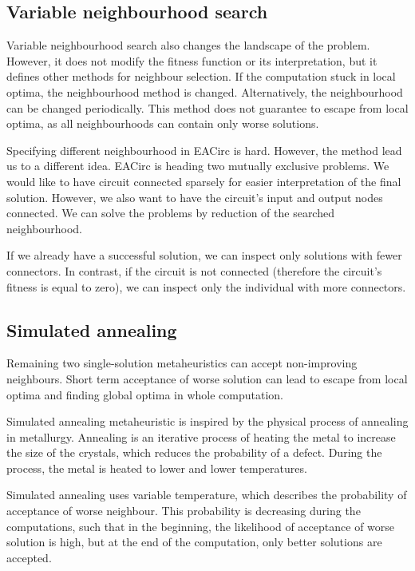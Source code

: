 \documentclass[
  print, %
  Table,   %
  nolof,     %
  nolot,     %
  11pt, %
  oneside  %
]{fithesis3}
\begin{document}
\subsection{Variable neighbourhood search}
\label{subsec:opt-single-sol-vns}

Variable neighbourhood search also changes the landscape of the problem. However, it does not modify the fitness function or its interpretation, but it defines other methods for neighbour selection. If the computation stuck in local optima, the neighbourhood method is changed. Alternatively, the neighbourhood can be changed periodically. This method does not guarantee to escape from local optima, as all neighbourhoods can contain only worse solutions.

Specifying different neighbourhood in EACirc is hard. However, the method lead us to a different idea. EACirc is heading two mutually exclusive problems. We would like to have circuit connected sparsely for easier interpretation of the final solution. However, we also want to have the circuit's input and output nodes connected. We can solve the problems by reduction of the searched neighbourhood.

If we already have a successful solution, we can inspect only solutions with fewer connectors. In contrast, if the circuit is not connected (therefore the circuit's fitness is equal to zero), we can inspect only the individual with more connectors.

\subsection{Simulated annealing}
\label{subsec:opt-single-sol-sa}

Remaining two single-solution metaheuristics can accept non-improving neighbours. Short term acceptance of worse solution can lead to escape from local optima and finding global optima in whole computation.

Simulated annealing metaheuristic is inspired by the physical process of annealing in metallurgy. Annealing is an iterative process of heating the metal to increase the size of the crystals, which reduces the probability of a defect. During the process, the metal is heated to lower and lower temperatures.

Simulated annealing uses variable temperature, which describes the probability of acceptance of worse neighbour. This probability is decreasing during the computations, such that in the beginning, the likelihood of acceptance of worse solution is high, but at the end of the computation, only better solutions are accepted.
\end{document}
